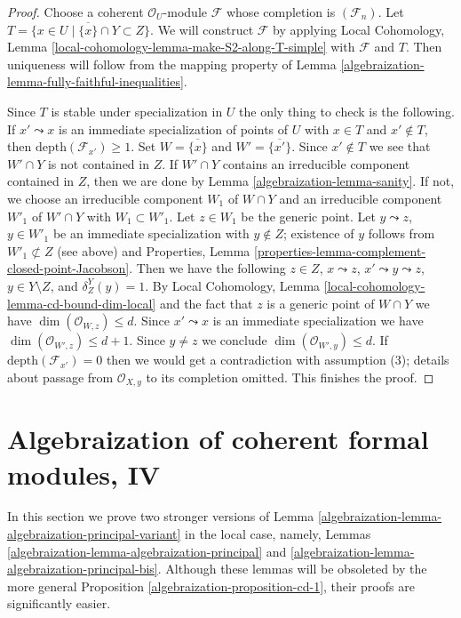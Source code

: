 \begin{proof}

Choose a coherent $\mathcal{O}_U$-module $\mathcal{F}$ whose
completion is $(\mathcal{F}_n)$. Let
$T = \{x \in U \mid \overline{\{x\}} \cap Y \subset Z\}$.
We will construct $\mathcal{F}$ by applying Local Cohomology,
Lemma \ref{local-cohomology-lemma-make-S2-along-T-simple}
with $\mathcal{F}$ and $T$.
Then uniqueness will follow from the mapping property
of Lemma \ref{algebraization-lemma-fully-faithful-inequalities}.

\medskip\noindent
Since $T$ is stable under specialization in $U$ the only
thing to check is the following. If $x' \leadsto x$ is an
immediate specialization of points of $U$ with $x \in T$
and $x' \not \in T$, then $\text{depth}(\mathcal{F}_{x'}) \geq 1$.
Set $W = \overline{\{x\}}$ and $W' = \overline{\{x'\}}$.
Since $x' \not \in T$ we see that $W' \cap Y$ is not contained in $Z$.
If $W' \cap Y$ contains an irreducible component contained in $Z$,
then we are done by Lemma \ref{algebraization-lemma-sanity}.
If not, we choose an irreducible component $W_1$ of $W \cap Y$ and
an irreducible component $W'_1$ of $W' \cap Y$ with $W_1 \subset W'_1$.
Let $z \in W_1$ be the generic point. Let $y \leadsto z$, $y \in W'_1$
be an immediate specialization with $y \not \in Z$; existence of $y$
follows from $W'_1 \not \subset Z$ (see above) and
Properties, Lemma \ref{properties-lemma-complement-closed-point-Jacobson}.
Then we have the following $z \in Z$, $x \leadsto z$,
$x' \leadsto y \leadsto z$, $y \in Y \setminus Z$, and $\delta^Y_Z(y) = 1$.
By Local Cohomology, Lemma \ref{local-cohomology-lemma-cd-bound-dim-local}
and the fact that $z$
is a generic point of $W \cap Y$ we have
$\dim(\mathcal{O}_{W, z}) \leq d$.
Since $x' \leadsto x$ is an immediate specialization we have
$\dim(\mathcal{O}_{W', z}) \leq d + 1$.
Since $y \not = z$ we conclude
$\dim(\mathcal{O}_{W', y}) \leq d$.
If $\text{depth}(\mathcal{F}_{x'}) = 0$ then we would get
a contradiction with assumption (3); details about passage
from $\mathcal{O}_{X, y}$ to its completion omitted.
This finishes the proof.
\end{proof}

\section{Algebraization of coherent formal modules, IV}
\label{algebraization-section-algebraization-modules-local}
In this section we prove two stronger versions of
Lemma \ref{algebraization-lemma-algebraization-principal-variant}
in the local case, namely, Lemmas \ref{algebraization-lemma-algebraization-principal}
and \ref{algebraization-lemma-algebraization-principal-bis}.
Although these lemmas will be obsoleted by the more general
Proposition \ref{algebraization-proposition-cd-1}, their proofs are significantly
easier.

